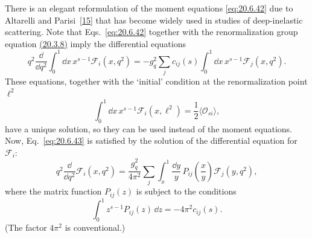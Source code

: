 There is an elegant reformulation of the moment equations \eqref{eq:20.6.42} due to Altarelli and Parisi~\hyperref[ch20-ref-15]{[15]} that has become widely used in studies of deep-inelastic scattering.
Note that Eqs.~\eqref{eq:20.6.42} together with the renormalization group equation \hyperref[eq:20.3.8]{(20.3.8)} imply the differential equations
\begin{equation}
q^2\frac{\dd}{\dd q^2}
\int_0^1\dd x\,x^{s-1}\mathcal F_i(x,q^2)
=-g_q^2\sum_jc_{ij}(s)
\int_0^1\dd x\,x^{s-1}\mathcal F_j(x,q^2).
\tag{20.6.43}\label{eq:20.6.43}
\end{equation}
These equations, together with the `initial' condition at the renormalization point $\ell^2$
\begin{equation}
\int_0^1\dd x\,x^{s-1}\mathcal F_i(x,\ell^2)
=\frac12\langle\mathcal O_{si}\rangle,
\tag{20.6.44}\label{eq:20.6.44}
\end{equation}
have a unique solution, so they can be used instead of the moment equations. Now, Eq.~\eqref{eq:20.6.43} is satisfied by the solution of the differential equation for $\mathcal F_i$:
\begin{equation}
q^2\frac{\dd}{\dd q^2}\mathcal F_i(x,q^2)
=\frac{g_q^2}{4\pi^2}
\sum_j\int_x^1\frac{\dd y}{y}\,
P_{ij}\left(\frac{x}{y}\right)
\mathcal F_j(y,q^2),
\tag{20.6.45}\label{eq:20.6.45}
\end{equation}
where the matrix function $P_{ij}(z)$ is subject to the conditions
\begin{equation}
\int_0^1z^{s-1}P_{ij}(z)\,\dd z
=-4\pi^2c_{ij}(s).
\tag{20.6.46}\label{eq:20.6.46}
\end{equation}
(The factor $4\pi^2$ is conventional.)

